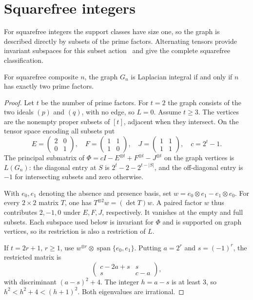 \section{Squarefree integers}

For squarefree integers the support classes have size one, so the graph
is described directly by subsets of the prime factors. Alternating tensors
provide invariant subspaces for this subset action~\cite{fultonharris} and
give the complete squarefree classification.

\begin{theorem}
\label{thm:squarefree}
For squarefree composite $n$, the graph $G_n$ is Laplacian integral if
and only if $n$ has exactly two prime factors.
\end{theorem}
\begin{proof}
Let $t$ be the number of prime factors. For $t=2$ the graph consists of
the two ideals $(p)$ and $(q)$, with no edge, so $L=0$. Assume $t\geq3$.
The vertices are the nonempty proper subsets of $[t]$, adjacent when they
intersect. On the tensor space encoding all subsets put
\[
E=\begin{pmatrix}2&0\\0&1\end{pmatrix},\quad
F=\begin{pmatrix}1&1\\1&0\end{pmatrix},\quad
J=\begin{pmatrix}1&1\\1&1\end{pmatrix},\quad c=2^t-1.
\]
The principal submatrix of
$\Phi=cI-E^{\otimes t}+F^{\otimes t}-J^{\otimes t}$
on the graph vertices is $L(G_n)$: the diagonal entry at $S$ is
$2^t-2-2^{t-|S|}$, and the off-diagonal entry is $-1$ for intersecting
subsets and zero otherwise.

With $e_0,e_1$ denoting the absence and presence basis, set
$w=e_0\otimes e_1-e_1\otimes e_0$.
For every $2\times2$ matrix $T$, one has
$T^{\otimes2}w=(\det T)w$. A paired factor $w$ thus contributes
$2,-1,0$ under $E,F,J$, respectively. It vanishes at the empty and
full subsets. Each subspace used below is invariant for $\Phi$ and is
supported on graph vertices, so its restriction is also a restriction of $L$.

If $t=2r+1$, $r\geq1$, use
$w^{\otimes r}\otimes\operatorname{span}\{e_0,e_1\}$.
Putting $a=2^r$ and $s=(-1)^r$, the restricted matrix is
\[
\begin{pmatrix}c-2a+s&s\\s&c-a\end{pmatrix},
\]
with discriminant $(a-s)^2+4$. The integer $h=a-s$ is at least $3$,
so $h^2<h^2+4<(h+1)^2$. Both eigenvalues are irrational.


\end{proof}
